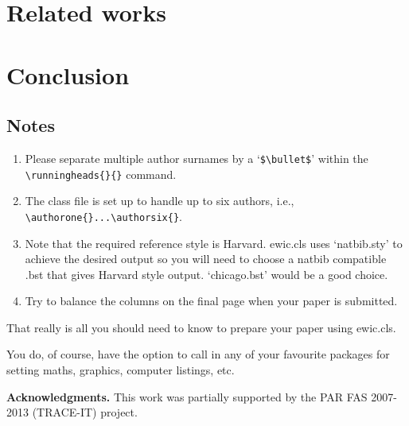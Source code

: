 \documentclass{ewic}
\begin{document}
			\section{Related works}
			\section{Conclusion}
			
			
			
			\pagebreak
			\subsection{Notes}
			\begin{enumerate}
			\item Please separate multiple author surnames by a `\verb+$\bullet$+' within the
			\verb+\runningheads{}{}+ command.
			
			\item The class file is set up to handle up to six authors, i.e., \verb+\authorone{}...\authorsix{}+.
			
			\item Note that the required reference style is Harvard. ewic.cls
			uses `natbib.sty' to achieve the desired output so you will need
			to choose a natbib compatible .bst that gives Harvard style
			output. `chicago.bst' would be a good choice.
			
			\item Try to balance the columns on the final page when your paper is submitted.
			\end{enumerate}
			
			That really is all you should need to know to prepare your paper
			using ewic.cls.\citep{Mills2003}
			
			You do, of course, have the option to call in any of your
			favourite packages for setting maths, graphics, computer listings,
			etc.
			
			\textbf{Acknowledgments. }
			This work was partially supported by the PAR FAS 2007-2013 (TRACE-IT) project.
			
			
			
			
			
			
			
\end{document}
